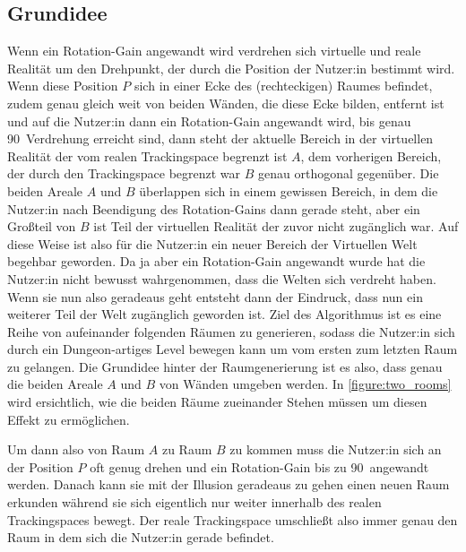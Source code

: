\subsection{Grundidee}
\label{subsec:roomplaceidea}
Wenn ein Rotation-Gain angewandt wird verdrehen sich virtuelle und reale Realität um den Drehpunkt, der durch die Position der Nutzer:in bestimmt wird. Wenn diese Position $P$ sich in einer Ecke des (rechteckigen) Raumes befindet, zudem genau gleich weit von beiden Wänden, die diese Ecke bilden, entfernt ist und auf die Nutzer:in dann ein Rotation-Gain angewandt wird,
bis genau 90\textdegree\ Verdrehung erreicht sind, dann steht der aktuelle Bereich in der virtuellen Realität der vom realen Trackingspace begrenzt ist $A$, dem vorherigen Bereich, der durch den Trackingspace begrenzt war $B$ genau orthogonal gegenüber.
Die beiden Areale $A$ und $B$ überlappen sich in einem gewissen Bereich, in dem die Nutzer:in nach Beendigung des Rotation-Gains dann gerade steht, aber ein Großteil von $B$ ist Teil der virtuellen Realität der zuvor nicht zugänglich war. Auf diese Weise ist also für die Nutzer:in ein neuer Bereich der Virtuellen Welt begehbar geworden.
Da ja aber ein Rotation-Gain angewandt wurde hat die Nutzer:in nicht bewusst wahrgenommen, dass die Welten sich verdreht haben. Wenn sie nun also geradeaus geht entsteht dann der Eindruck, dass nun ein weiterer Teil der Welt zugänglich geworden ist.
Ziel des Algorithmus ist es eine Reihe von aufeinander folgenden Räumen zu generieren, sodass die Nutzer:in sich durch ein Dungeon-artiges Level bewegen kann um vom ersten zum letzten Raum zu gelangen.
Die Grundidee hinter der Raumgenerierung ist es also, dass genau die beiden Areale $A$ und $B$ von Wänden umgeben werden. %
In \autoref{figure:two_rooms} wird ersichtlich, wie die beiden Räume zueinander Stehen müssen um diesen Effekt zu ermöglichen.

Um dann also von Raum $A$ zu Raum $B$ zu kommen muss die Nutzer:in sich an der Position $P$ oft genug drehen und ein Rotation-Gain bis zu 90\textdegree\ angewandt werden.
Danach kann sie mit der Illusion geradeaus zu gehen einen neuen Raum erkunden während sie sich eigentlich nur weiter innerhalb des realen Trackingspaces bewegt. Der reale Trackingspace umschließt also immer genau den Raum in dem sich die Nutzer:in gerade befindet.

